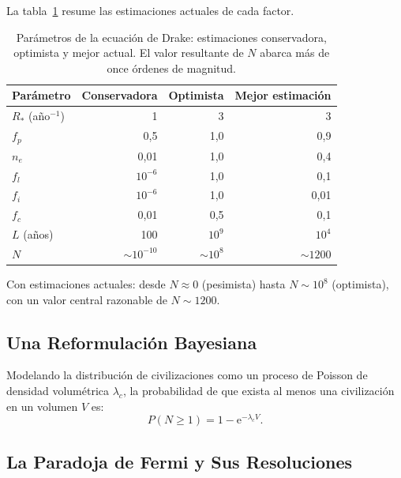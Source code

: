 \documentclass[12pt,a4paper]{article}
\newcommand{\ee}{\mathrm{e}}
\begin{document}
La tabla~\ref{tab:drake_es} resume las estimaciones actuales de cada factor.

\begin{table}[ht]
  \centering
  \caption{Parámetros de la ecuación de Drake: estimaciones conservadora,
    optimista y mejor actual. El valor resultante de $N$ abarca más de once
    órdenes de magnitud.}
  \label{tab:drake_es}
  \begin{tabularx}{\textwidth}{X r r r}
    \toprule
    Parámetro & Conservadora & Optimista & Mejor estimación \\
    \midrule
    $R_*$ (año$^{-1}$) & 1    & 3          & 3    \\
    $f_p$              & 0{,}5  & 1{,}0        & 0{,}9  \\
    $n_e$              & 0{,}01 & 1{,}0        & 0{,}4  \\
    $f_l$              & $10^{-6}$ & 1{,}0  & 0{,}1  \\
    $f_i$              & $10^{-6}$ & 1{,}0  & 0{,}01 \\
    $f_c$              & 0{,}01 & 0{,}5        & 0{,}1  \\
    $L$ (años)         & 100  & $10^9$     & $10^4$ \\
    \midrule
    $N$       & $\sim 10^{-10}$ & $\sim 10^8$ & $\sim 1200$ \\
    \bottomrule
  \end{tabularx}
\end{table}

Con estimaciones actuales: desde $N \approx 0$ (pesimista) hasta $N \sim 10^8$
(optimista), con un valor central razonable de $N \sim 1200$.

\subsection{Una Reformulación Bayesiana}

Modelando la distribución de civilizaciones como un proceso de Poisson de
densidad volumétrica $\lambda_c$, la probabilidad de que exista al menos
una civilización en un volumen $V$ es:
\begin{equation}
  P(N \geq 1) = 1 - \ee^{-\lambda_c V}.
\end{equation}

\subsection{La Paradoja de Fermi y Sus Resoluciones}
\end{document}
